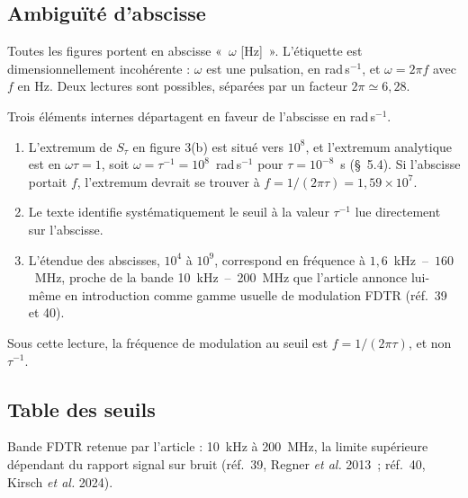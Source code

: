 \documentclass[11pt,a4paper]{article}
\begin{document}
\subsection{Ambiguïté d'abscisse}

Toutes les figures portent en abscisse «~$\omega$ [Hz]~». L'étiquette est dimensionnellement
incohérente : $\omega$ est une pulsation, en rad\,s$^{-1}$, et $\omega = 2\pi f$ avec $f$ en Hz.
Deux lectures sont possibles, séparées par un facteur $2\pi \simeq 6{,}28$.

Trois éléments internes départagent en faveur de l'abscisse en rad\,s$^{-1}$.

\begin{enumerate}[leftmargin=1.6em,itemsep=2pt,topsep=2pt]
\item L'extremum de $S_\tau$ en figure 3(b) est situé vers $10^8$, et l'extremum analytique est
      en $\omega\tau = 1$, soit $\omega = \tau^{-1} = 10^8$~rad\,s$^{-1}$ pour
      $\tau = 10^{-8}$~s (§~5.4). Si l'abscisse portait $f$, l'extremum devrait se trouver à
      $f = 1/(2\pi\tau) = 1{,}59\times10^7$.
\item Le texte identifie systématiquement le seuil à la valeur $\tau^{-1}$ lue directement sur
      l'abscisse.
\item L'étendue des abscisses, $10^4$ à $10^9$, correspond en fréquence à
      $1{,}6$~kHz~--~$160$~MHz, proche de la bande 10~kHz~--~200~MHz que l'article
      annonce lui-même en introduction comme gamme usuelle de modulation FDTR (réf.~39 et 40).
\end{enumerate}

Sous cette lecture, la fréquence de modulation au seuil est $f = 1/(2\pi\tau)$, et non
$\tau^{-1}$.

\subsection{Table des seuils}

Bande FDTR retenue par l'article : 10~kHz à 200~MHz, la limite supérieure dépendant du rapport
signal sur bruit (réf.~39, Regner \textit{et al.} 2013~; réf.~40, Kirsch \textit{et al.} 2024).
\end{document}
